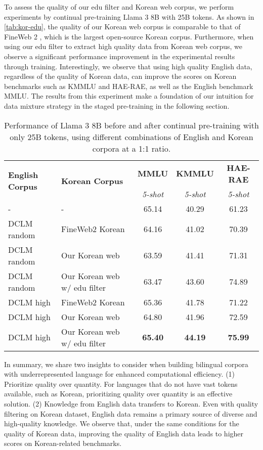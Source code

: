 To assess the quality of our edu filter and Korean web corpus, we perform experiments by continual pre-training Llama 3 8B with 25B tokens.
As shown in \autoref{tab:kor-edu}, the quality of our Korean web corpus is comparable to that of FineWeb 2 \citep{penedo2024fineweb-2}, which is the largest open-source Korean corpus.
Furthermore, when using our edu filter to extract high quality data from Korean web corpus, we observe a significant performance improvement in the experimental results through training.
Interestingly, we observe that using high quality English data, regardless of the quality of Korean data, can improve the scores on Korean benchmarks such as KMMLU and HAE-RAE, as well as the English benchmark MMLU. 
The results from this experiment make a foundation of our intuition for data mixture strategy in the staged pre-training in the following section.

\begin{table}[ht]
    \centering
        \begin{tabular}{ll|ccc}
        \toprule
        \multirow{2}{*}{\textbf{English Corpus}} & \multirow{2}{*}{\textbf{Korean Corpus}} & \textbf{MMLU} & \textbf{KMMLU} & \textbf{HAE-RAE} \\
        & & \textit{5-shot} & \textit{5-shot} & \textit{5-shot} \\
        \midrule
        - & - & 65.14 & 40.29 & 61.23 \\ %
        \midrule
        DCLM random & FineWeb2 Korean & 64.16 & 41.02 & 70.39 \\
        DCLM random & Our Korean web & 63.59 & 41.41 & 71.31 \\
        DCLM random & Our Korean web w/ edu filter & 63.47 & 43.60 & 74.89\\
        DCLM high & FineWeb2 Korean & 65.36 & 41.78 & 71.22 \\
        DCLM high  & Our Korean web & 64.80 & 41.96 & 72.59 \\
        DCLM high & Our Korean web w/ edu filter & \textbf{65.40} & \textbf{44.19} & \textbf{75.99} \\
        
        \bottomrule
        \end{tabular}
    \caption{Performance of Llama 3 8B before and after continual pre-training with only 25B tokens, using different combinations of English and Korean corpora at a 1:1 ratio.}
    \label{tab:kor-edu}
\end{table}

In summary, we share two insights to consider when building bilingual corpora with underrepresented language for enhanced computational efficiency.
(1) Prioritize quality over quantity.
For languages that do not have vast tokens available, such as Korean, prioritizing quality over quantity is an effective solution.
(2) Knowledge from English data transfers to Korean.
Even with quality filtering on Korean dataset, English data remains a primary source of diverse and high-quality knowledge.
We observe that, under the same conditions for the quality of Korean data, improving the quality of English data leads to higher scores on Korean-related benchmarks.
